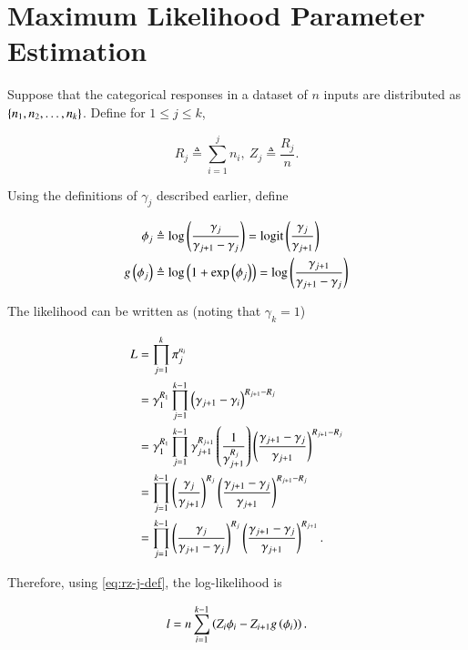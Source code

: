 \documentclass[journal,12pt,twocolumn]{IEEEtran}
\begin{document}
\section{Maximum Likelihood Parameter Estimation}

Suppose that the categorical responses in a dataset of \(n\) inputs are
distributed as \(\left\{n_1, n_2, \ldots, n_k\right\}\). Define for \(1 \le j \le k\),

\begin{equation}
     R_j \triangleq \sum_{i=1}^j n_i,\ Z_j \triangleq \frac{R_j}{n}.
     \label{eq:rz-j-def}
\end{equation}

Using the definitions of \(\gamma_j\) described earlier, define

\begin{align}
     \phi_j &\triangleq \log\left(\frac{\gamma_j}{\gamma_{j+1}-\gamma_j}\right) = \mathrm{logit}\left(\frac{\gamma_j}{\gamma_{j+1}}\right) \label{eq:phi-j-def} \\
     g\left(\phi_j\right) &\triangleq \log\left(1 + \exp\left(\phi_j\right)\right) = \log\left(\frac{\gamma_{j+1}}{\gamma_{j+1}-\gamma_j}\right)
     \label{eq:gphi-def}
\end{align}

The likelihood can be written as (noting that \(\gamma_k = 1\))

\begin{align}
     L &= \prod_{j=1}^{k}\pi_j^{n_i} \\
       &= \gamma_1^{R_1}\prod_{j=1}^{k-1}\left(\gamma_{j+1}-\gamma_i\right)^{R_{j+1}-R_j} \\
       &= \gamma_1^{R_1}\prod_{j=1}^{k-1}\gamma_{j+1}^{R_{j+1}}\left(\frac{1}{\gamma_{j+1}^{R_j}}\right)\left(\frac{\gamma_{j+1}-\gamma_j}{\gamma_{j+1}}\right)^{R_{j+1}-R_j} \\
       &= \prod_{j=1}^{k-1}\left(\frac{\gamma_j}{\gamma_{j+1}}\right)^{R_j}\left(\frac{\gamma_{j+1}-\gamma_j}{\gamma_{j+1}}\right)^{R_{j+1}-R_j} \\
       &= \prod_{j=1}^{k-1}\left(\frac{\gamma_j}{\gamma_{j+1}-\gamma_j}\right)^{R_j}\left(\frac{\gamma_{j+1}-\gamma_j}{\gamma_{j+1}}\right)^{R_{j+1}}.
       \label{eq:ord-reg-L}
\end{align}

Therefore, using \eqref{eq:rz-j-def}, the log-likelihood is

\begin{equation}
     l = n\sum_{i=1}^{k-1}\left(Z_i\phi_i - Z_{i+1}g\left(\phi_i\right)\right).
     \label{eq:ord-reg-l}
\end{equation}
\end{document}
